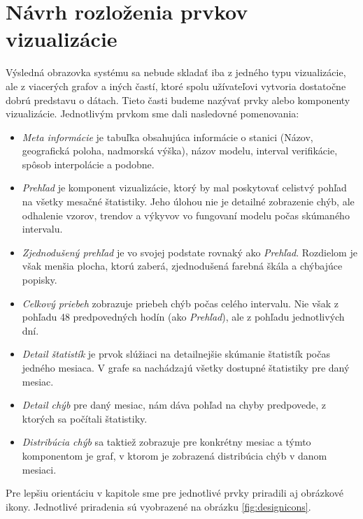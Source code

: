 \section{Návrh rozloženia prvkov vizualizácie}
Výsledná obrazovka systému sa nebude skladať iba z jedného typu vizualizácie, ale z viacerých grafov a iných častí, ktoré spolu užívateľovi vytvoria dostatočne dobrú predstavu o dátach. Tieto časti budeme nazývať prvky alebo komponenty vizualizácie. Jednotlivým prvkom sme dali nasledovné pomenovania: 

\begin{itemize}
	\item\textit{Meta informácie} je tabuľka obsahujúca informácie o stanici (Názov, geografická poloha, nadmorská výška), názov modelu, interval verifikácie, spôsob interpolácie a podobne.  
		
	\item\textit{Prehľad} je komponent vizualizácie, ktorý by mal poskytovať celistvý pohľad na všetky mesačné štatistiky. Jeho úlohou nie je detailné zobrazenie chýb, ale odhalenie vzorov, trendov a výkyvov vo fungovaní modelu počas skúmaného intervalu.
	
	\item\textit{Zjednodušený prehľad} je vo svojej podstate rovnaký ako \textit{Prehľad}. Rozdielom je však menšia plocha, ktorú zaberá, zjednodušená farebná škála a chýbajúce popisky.
	
	\item\textit{Celkový priebeh} zobrazuje priebeh chýb počas celého intervalu. Nie však z pohľadu 48 predpovedných hodín (ako \textit{Prehľad}), ale z pohľadu jednotlivých dní.
	
	\item\textit{Detail štatistík} je prvok slúžiaci na detailnejšie skúmanie štatistík počas jedného mesiaca. V grafe sa nachádzajú všetky dostupné štatistiky pre daný mesiac.
	
	\item\textit{Detail chýb} pre daný mesiac, nám dáva pohľad na chyby predpovede, z ktorých sa počítali štatistiky.
	
	\item\textit{Distribúcia chýb} sa taktiež zobrazuje pre konkrétny mesiac a týmto komponentom je graf, v ktorom je zobrazená distribúcia chýb v danom mesiaci.
\end{itemize}

 Pre lepšiu orientáciu v kapitole sme pre jednotlivé prvky priradili aj obrázkové ikony. Jednotlivé priradenia sú vyobrazené na obrázku \ref{fig:designicons}. 
 
